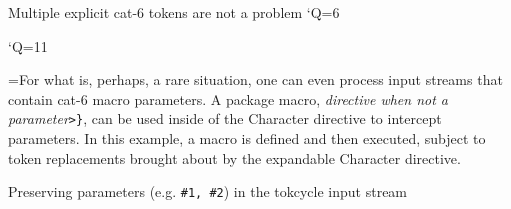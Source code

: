 \documentclass[10pt]{article}
\def\ddbend{\setbox0=\hbox{\dbend\dbend}\leavevmode\llap{%
  \raisebox{10pt}{\box0~}}}
\newcommand\TokCycle{\textsf{tokcycle}}
\begin{document}
\begingroup
\resettokcycle
{}








\begin{exampleA}[lefthand width=6.5cm]{Multiple explicit cat-6 tokens are not 
  a problem}
\catcode`Q=6
\the\cytoks
\end{exampleA}

\catcode`Q=11
\hrulefill
\endgroup

\ddbend For what is, perhaps, a rare situation, one can even process input 
  streams that contain cat-6 macro parameters.
A package macro, %
  \textit{directive when not a parameter}\verb|>}|, can be
  used inside of the Character directive to intercept parameters.
In this example, a macro is defined and then executed, subject to
  token replacements brought about by the expandable Character directive.

\begin{exampleA}[lefthand width=7cm]{Preserving parameters (e.g.
  \texttt{\#1, \#2}) in the \TokCycle{} input stream}
\the\cytoks
\end{exampleA}
\end{document}
